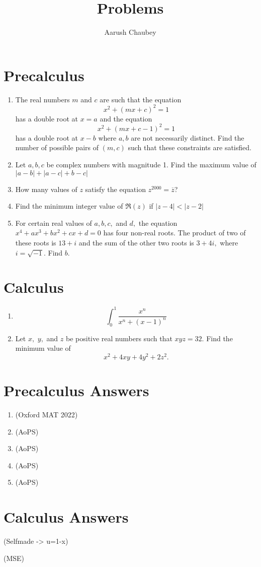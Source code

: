 \documentclass{article}
\title{Problems}
\author{Aarush Chaubey}
\date{}
\begin{document}
\maketitle

\section{Precalculus}
\begin{enumerate}
    \item The real numbers $m$ and $c$ are such that the equation \[x^2+(mx+c)^2 = 1\] has a double root at $x=a$ and the equation \[x^2+(mx+c-1)^2 = 1\] has a double root at $x-b$ where $a,b$ are not necessarily distinct. Find the number of possible pairs of $(m,c)$ such that these constraints are satisfied. 
    \item Let $a,b,c$ be complex numbers with magnitude 1. Find the maximum value of $|a-b|+|a-c|+b-c|$
    \item How many values of $z$ satisfy the equation $z^{2000}=\overline{z}$?
    \item Find the minimum integer value of $\Re(z)$ if $|z-4|<|z-2|$
    \item For certain real values of $a, b, c,$ and $d,$ the equation $x^4+ax^3+bx^2+cx+d=0$ has four non-real roots. The product of two of these roots is $13+i$ and the sum of the other two roots is $3+4i,$ where $i=\sqrt{-1}.$ Find $b.$
    

\end{enumerate}

\section{Calculus}
\begin{enumerate}
    \item \[\int_0^1 \frac{x^n}{x^n+(x-1)^n}\]
    \item Let $x,$ $y,$ and $z$ be positive real numbers such that $xyz = 32.$ Find the minimum value of \[x^2 + 4xy + 4y^2 + 2z^2.\]
\end{enumerate}



\section{Precalculus Answers}
\begin{enumerate}
    \item {} (Oxford MAT 2022)
    \item {} (AoPS)
    \item {} (AoPS)
    \item {} (AoPS)
    \item {} (AoPS)
    
\end{enumerate}
\section{Calculus Answers}
\item {}(Selfmade -> u=1-x)
\item {}(MSE)
\end{document}
